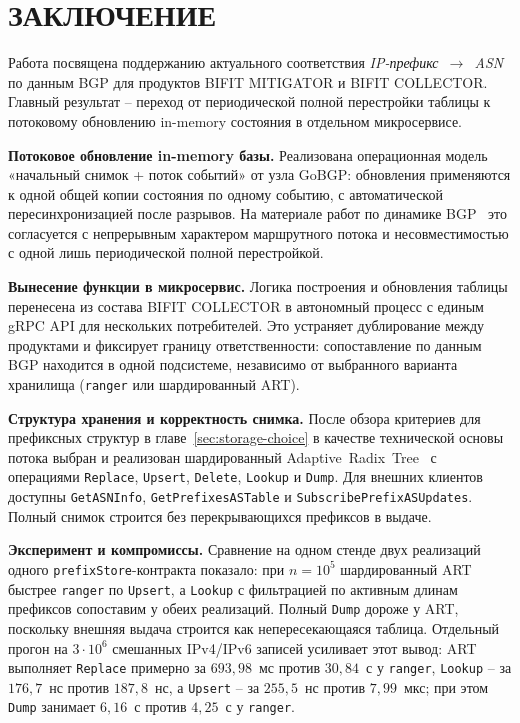 \section*{ЗАКЛЮЧЕНИЕ}

Работа посвящена поддержанию актуального соответствия
\textit{IP-префикс~$\rightarrow$~ASN} по данным BGP для продуктов BIFIT
MITIGATOR и BIFIT COLLECTOR. Главный результат -- переход от
периодической полной перестройки таблицы к потоковому обновлению
in-memory состояния в отдельном микросервисе.

\textbf{Потоковое обновление in-memory базы.} Реализована операционная
модель «начальный снимок + поток событий» от узла GoBGP: обновления
применяются к одной общей копии состояния по одному событию, с
автоматической пересинхронизацией после разрывов. На материале работ по
динамике BGP~\cite{labovitz1997instability,labovitz2000convergence,
griffin2002stablepaths} это согласуется с непрерывным характером
маршрутного потока и несовместимостью с одной лишь периодической полной
перестройкой.

\textbf{Вынесение функции в микросервис.} Логика построения и обновления
таблицы перенесена из состава BIFIT COLLECTOR в автономный процесс с
единым gRPC API для нескольких потребителей. Это устраняет дублирование
между продуктами и фиксирует границу ответственности: сопоставление по
данным BGP находится в одной подсистеме, независимо от выбранного
варианта хранилища
(\texttt{ranger} или шардированный ART).

\textbf{Структура хранения и корректность снимка.} После обзора
критериев для префиксных структур в главе~\ref{sec:storage-choice} в качестве
технической основы потока выбран и реализован шардированный
Adaptive~Radix~Tree~\cite{leis2013art} с операциями \texttt{Replace},
\texttt{Upsert}, \texttt{Delete}, \texttt{Lookup} и \texttt{Dump}. Для
внешних клиентов доступны \texttt{GetASNInfo},
\texttt{GetPrefixesASTable} и \texttt{SubscribePrefixASUpdates}. Полный
снимок строится без перекрывающихся префиксов в выдаче.

\textbf{Эксперимент и компромиссы.} Сравнение на одном стенде двух
реализаций одного \texttt{prefixStore}-контракта показало: при
$n = 10^5$ шардированный ART быстрее \texttt{ranger} по
\texttt{Upsert}, а \texttt{Lookup} с фильтрацией по активным длинам
префиксов сопоставим у обеих реализаций. Полный
\texttt{Dump} дороже у ART, поскольку внешняя выдача строится как
непересекающаяся таблица. Отдельный прогон на $3\cdot10^6$ смешанных
IPv4/IPv6 записей усиливает этот вывод: ART выполняет \texttt{Replace}
примерно за $693{,}98$~мс против $30{,}84$~с у \texttt{ranger},
\texttt{Lookup} -- за $176{,}7$~нс против $187{,}8$~нс, а
\texttt{Upsert} -- за $255{,}5$~нс против $7{,}99$~мкс; при этом
\texttt{Dump} занимает $6{,}16$~с против $4{,}25$~с у \texttt{ranger}.


